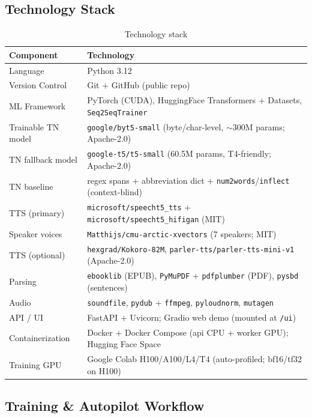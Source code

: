 \documentclass[12pt,a4paper]{article}
\begin{document}
\subsection{Technology Stack}

\begin{table}[H]
\centering
\caption{Technology stack}
\small
\begin{tabularx}{\linewidth}{@{} l L @{}}
\toprule
\textbf{Component} & \textbf{Technology} \\
\midrule
Language & Python 3.12 \\
Version Control & Git + GitHub (public repo) \\
ML Framework & PyTorch (CUDA), HuggingFace Transformers + Datasets, \texttt{Seq2SeqTrainer} \\
Trainable TN model & \texttt{google/byt5-small} (byte/char-level, $\sim$300M params; Apache-2.0) \\
TN fallback model & \texttt{google-t5/t5-small} (60.5M params, T4-friendly; Apache-2.0) \\
TN baseline & regex spans + abbreviation dict + \texttt{num2words}/\texttt{inflect} (context-blind) \\
TTS (primary) & \texttt{microsoft/speecht5\_tts} + \texttt{microsoft/speecht5\_hifigan} (MIT) \\
Speaker voices & \texttt{Matthijs/cmu-arctic-xvectors} (7 speakers; MIT) \\
TTS (optional) & \texttt{hexgrad/Kokoro-82M}, \texttt{parler-tts/parler-tts-mini-v1} (Apache-2.0) \\
Parsing & \texttt{ebooklib} (EPUB), \texttt{PyMuPDF} + \texttt{pdfplumber} (PDF), \texttt{pysbd} (sentences) \\
Audio & \texttt{soundfile}, \texttt{pydub} + \texttt{ffmpeg}, \texttt{pyloudnorm}, \texttt{mutagen} \\
API / UI & FastAPI + Uvicorn; Gradio web demo (mounted at \texttt{/ui}) \\
Containerization & Docker + Docker Compose (api CPU + worker GPU); Hugging Face Space \\
Training GPU & Google Colab H100/A100/L4/T4 (auto-profiled; bf16/tf32 on H100) \\
\bottomrule
\end{tabularx}
\end{table}

\subsection{Training \& Autopilot Workflow}
\label{subsec:workflow}
\end{document}
